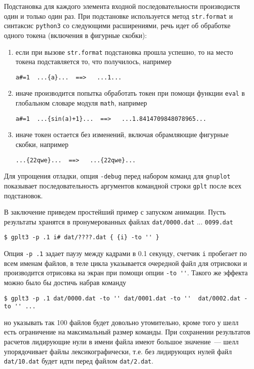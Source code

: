 \documentclass[12pt]{article}
\def\gplt{{\tt gplt}}
\def\gnuplot{{\tt gnuplot}}
\def\python{{\tt python3}}
\begin{document}
Подстановка для каждого элемента входной последовательности производистя один и только один раз.
При подстановке используется метод \verb'str.format' и синтаксис \python{} со следующими расширениями, речь идет об обработке одного токена (включения в фигурные скобки):
\begin{enumerate}
\item если при вызове \verb'str.format' подстановка прошла успешно, то на место токена подставляется то, что получилось, например
\begin{verbatim}
a#=1  ...{a}...  ==>   ...1...
\end{verbatim}
\item иначе производится попытка обработать токен при помощи функции \verb'eval' в глобальном словаре модуля \verb'math', например
\begin{verbatim}
a#=1  ...{sin(a)+1}...  ==>   ...1.8414709848078965...
\end{verbatim}  
\item иначе токен остается без изменений, включая обрамляющие фигурные скобки, например
\begin{verbatim}
...{22qwe}...  ==>   ...{22qwe}...
\end{verbatim}    
\end{enumerate}
Для упрощения отладки, опция \verb'-debug' перед набором команд для \gnuplot{} показывает
последовательность аргументов командной строки \gplt{} после всех подстановок.

В заключение приведем простейший пример с запуском анимации. Пусть результаты хранятся в пронумерованных файлах \verb'dat/0000.dat' ... \verb'0099.dat'
\begin{verbatim}
$ gplt3 -p .1 i# dat/????.dat { {i} -to '' }
\end{verbatim}
Опция \verb'-p .1' задает паузу между кадрами в 0.1 секунду, счетчик \verb'i' пробегает по всем именам файлов, в теле цикла указывается очередной файл
для отрисвоки и производится отрисовка на экран при помощи опции \verb|-to ''|. Такого же эффекта можно было бы достичь набрав команду
\begin{verbatim}
$ gplt3 -p .1 dat/0000.dat -to '' dat/0001.dat -to ''  dat/0002.dat -to '' ...
\end{verbatim}
но указывать так 100 файлов будет довольно утомительно, кроме того у шелл есть ограничение на максимальный размер команды.
При сохранении результатов расчетов лидирующие нули в имени файла имеют большое значение~--- шелл упорядочивает файлы лексикографически, т.е. без лидирующих нулей
файл \verb'dat/10.dat' будет идти перед файлом \verb'dat/2.dat'.
\end{document}
